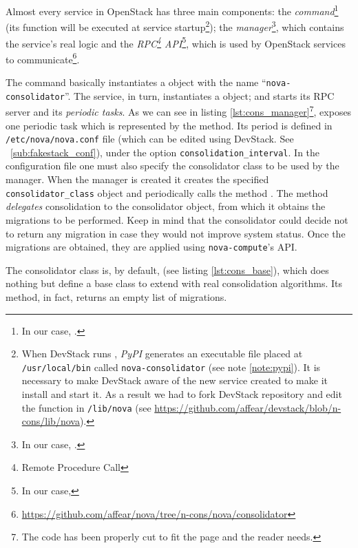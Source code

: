 Almost every service in OpenStack has three main components: the \emph{command}\footnote{In our case, .} (its function  will be executed at service startup\footnote{When DevStack runs , \textit{PyPI} generates an executable file placed at \texttt{/usr/local/bin} called \texttt{nova-consolidator} (see note \ref{note:pypi}). It is necessary to make DevStack aware of the new service created to make it install and start it. As a result we had to fork DevStack repository and edit the function  in \texttt{/lib/nova} (see \url{https://github.com/affear/devstack/blob/n-cons/lib/nova}).}); the \emph{manager}\footnote{In our case, .}, which contains the service's real logic and the \emph{RPC\footnote{Remote Procedure Call} API}\footnote{In our case, }, which is used by OpenStack services to communicate\footnote{\url{https://github.com/affear/nova/tree/n-cons/nova/consolidator}}.

The command basically instantiates a  object with the name ``\texttt{nova-consolidator}''. The service, in turn, instantiates a  object; and starts its RPC server and its \emph{periodic tasks}. As we can see in listing \ref{lst:cons_manager}\footnote{\label{note:cons_code}The code has been properly cut to fit the page and the reader needs.},  exposes one periodic task which is represented by the  method.
Its period is defined in \texttt{/etc/nova/nova.conf} file (which can be edited using DevStack. See ~\ref{sub:fakestack_conf}), under the option \texttt{consolidation\_interval}. In the configuration file one must also specify the consolidator class to be used by the manager. When the manager is created it creates the specified \texttt{consolidator\_class} object and periodically calls the method . The  method \emph{delegates} consolidation to the consolidator object, from which it obtains the migrations to be performed. Keep in mind that the consolidator could decide not to return any migration in case they would not improve system status. Once the migrations are obtained, they are applied using \texttt{nova-compute}'s API.

The consolidator class is, by default,  (see listing \ref{lst:cons_base}), which does nothing but define a base class to extend with real consolidation algorithms. Its  method, in fact, returns an empty list of migrations.

